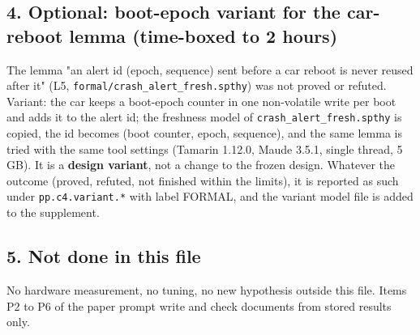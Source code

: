 \subsection*{4. Optional: boot-epoch variant for the car-reboot lemma (time-boxed to 2 hours)}

The lemma "an alert id (epoch, sequence) sent before a car reboot is never reused after it" (L5, \texttt{formal/crash\_alert\_fresh.spthy}) was not proved or refuted. Variant: the car keeps a boot-epoch counter in one non-volatile write per boot and adds it to the alert id; the freshness model of \texttt{crash\_alert\_fresh.spthy} is copied, the id becomes (boot counter, epoch, sequence), and the same lemma is tried with the same tool settings (Tamarin 1.12.0, Maude 3.5.1, single thread, 5 GB). It is a \textbf{design variant}, not a change to the frozen design. Whatever the outcome (proved, refuted, not finished within the limits), it is reported as such under \texttt{pp.c4.variant.*} with label FORMAL, and the variant model file is added to the supplement.

\subsection*{5. Not done in this file}

No hardware measurement, no tuning, no new hypothesis outside this file. Items P2 to P6 of the paper prompt write and check documents from stored results only.

